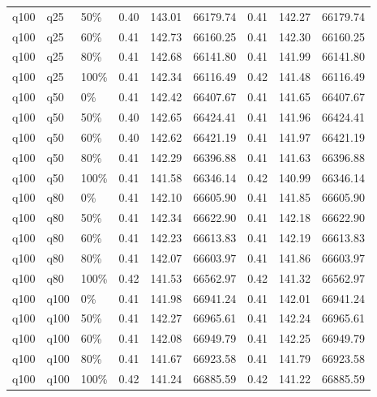 \begin{longtable}{lllrrrrrr}
  q100 & q25 & 50\% & 0.40 & 143.01 & 66179.74 & 0.41 & 142.27 & 66179.74 \\ 
  q100 & q25 & 60\% & 0.41 & 142.73 & 66160.25 & 0.41 & 142.30 & 66160.25 \\ 
  q100 & q25 & 80\% & 0.41 & 142.68 & 66141.80 & 0.41 & 141.99 & 66141.80 \\ 
  q100 & q25 & 100\% & 0.41 & 142.34 & 66116.49 & 0.42 & 141.48 & 66116.49 \\ 
  q100 & q50 & 0\% & 0.41 & 142.42 & 66407.67 & 0.41 & 141.65 & 66407.67 \\ 
  q100 & q50 & 50\% & 0.40 & 142.65 & 66424.41 & 0.41 & 141.96 & 66424.41 \\ 
  q100 & q50 & 60\% & 0.40 & 142.62 & 66421.19 & 0.41 & 141.97 & 66421.19 \\ 
  q100 & q50 & 80\% & 0.41 & 142.29 & 66396.88 & 0.41 & 141.63 & 66396.88 \\ 
  q100 & q50 & 100\% & 0.41 & 141.58 & 66346.14 & 0.42 & 140.99 & 66346.14 \\ 
  q100 & q80 & 0\% & 0.41 & 142.10 & 66605.90 & 0.41 & 141.85 & 66605.90 \\ 
  q100 & q80 & 50\% & 0.41 & 142.34 & 66622.90 & 0.41 & 142.18 & 66622.90 \\ 
  q100 & q80 & 60\% & 0.41 & 142.23 & 66613.83 & 0.41 & 142.19 & 66613.83 \\ 
  q100 & q80 & 80\% & 0.41 & 142.07 & 66603.97 & 0.41 & 141.86 & 66603.97 \\ 
  q100 & q80 & 100\% & 0.42 & 141.53 & 66562.97 & 0.42 & 141.32 & 66562.97 \\ 
  q100 & q100 & 0\% & 0.41 & 141.98 & 66941.24 & 0.41 & 142.01 & 66941.24 \\ 
  q100 & q100 & 50\% & 0.41 & 142.27 & 66965.61 & 0.41 & 142.24 & 66965.61 \\ 
  q100 & q100 & 60\% & 0.41 & 142.08 & 66949.79 & 0.41 & 142.25 & 66949.79 \\ 
  q100 & q100 & 80\% & 0.41 & 141.67 & 66923.58 & 0.41 & 141.79 & 66923.58 \\ 
  q100 & q100 & 100\% & 0.42 & 141.24 & 66885.59 & 0.42 & 141.22 & 66885.59 \\ 
  \hline
\end{longtable}
\endgroup
